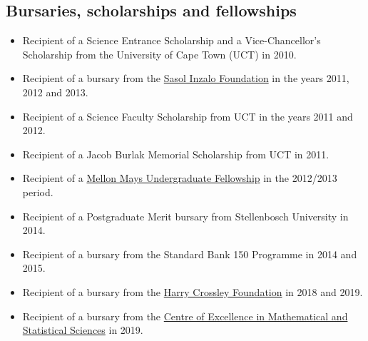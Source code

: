 \documentclass{article}
\begin{document}
\newpage
\subsection{Bursaries, scholarships and fellowships}
\begin{itemize}
	\item Recipient of a Science Entrance Scholarship and a Vice-Chancellor's Scholarship from the University of Cape Town (UCT) in 2010.
	\item Recipient of a bursary from the \href{http://www.sasolinzalofoundation.org.za/}{Sasol Inzalo Foundation} in the years 2011, 2012 and 2013.
	\item Recipient of a Science Faculty Scholarship from UCT in the years 2011 and 2012.
	\item Recipient of a Jacob Burlak Memorial Scholarship from UCT in 2011.
	\item Recipient of a \href{http://www.mmuf.org/}{Mellon Mays Undergraduate Fellowship} in the 2012/2013 period.
	\item Recipient of a Postgraduate Merit bursary from Stellenbosch University in 2014.
	\item Recipient of a bursary from the Standard Bank 150 Programme in 2014 and 2015.
	\item Recipient of a bursary from the \href{http://thecrossleyfoundation.co.za/}{Harry Crossley Foundation} in 2018 and 2019.
	\item Recipient of a bursary from the \href{https://www.wits.ac.za/coe-mass/}{Centre of Excellence in Mathematical and Statistical Sciences} in 2019.
\end{itemize}
\end{document}
